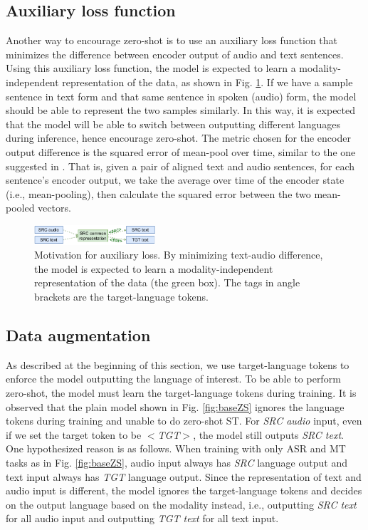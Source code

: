 \documentclass[conference]{IEEEtran}
\begin{document}
	\subsection{Auxiliary loss function} \label{sec:auxloss}
	Another way to encourage zero-shot is to use an auxiliary loss function that minimizes the difference between encoder output of audio and text sentences. Using this auxiliary loss function, the model is expected to learn a modality-independent representation of the data, as shown in Fig. \ref{fig:auxloss}. If we have a sample sentence in text form and that same sentence in spoken (audio) form, the model should be able to represent the two samples similarly. In this way, it is expected that the model will be able to switch between outputting different languages during inference, hence encourage zero-shot. The metric chosen for the encoder output difference is the squared error of mean-pool over time, similar to the one suggested in \cite{ZS-Quan}. That is, given a pair of aligned text and audio sentences, for each sentence's encoder output, we take the average over time of the encoder state (i.e., mean-pooling), then calculate the squared error between the two mean-pooled vectors.
	
	\begin{figure}[htbp]
		\centerline{\includegraphics[width=0.4\textwidth]{charts/AuxLoss.pdf}}
		\caption{Motivation for auxiliary loss. By minimizing text-audio difference, the model is expected to learn a modality-independent representation of the data (the green box). The tags in angle brackets are the target-language tokens.}
		\label{fig:auxloss}
	\end{figure}
	
	\subsection{Data augmentation} \label{sec:data_aug}
	As described at the beginning of this section, we use target-language tokens to enforce the model outputting the language of interest. To be able to perform zero-shot, the model must learn the target-language tokens during training. It is observed that the plain model shown in Fig. \ref{fig:baseZS} ignores the language tokens during training and unable to do zero-shot ST. For \textit{SRC audio} input, even if we set the target token to be \textit{$<$TGT$>$}, the model still outputs \textit{SRC text}. One hypothesized reason is as follows. When training with only ASR and MT tasks as in Fig. \ref{fig:baseZS}, audio input always has \textit{SRC} language output and text input always has \textit{TGT} language output. Since the representation of text and audio input is different, the model ignores the target-language tokens and decides on the output language based on the modality instead, i.e., outputting \textit{SRC text} for all audio input and outputting \textit{TGT text} for all text input. 
	
\end{document}
